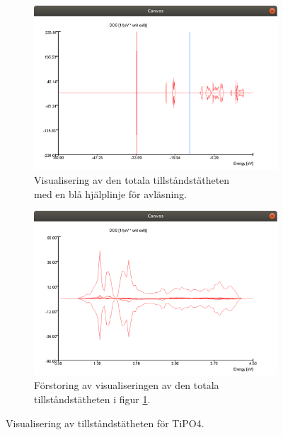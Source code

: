\begin{figure}[H]
    \begin{subfigure}{.5\textwidth}
        \centering
        \includegraphics[width=\linewidth]{images/TotalDoS.png}
        \caption{Visualisering av den totala tillståndstätheten \\med en blå hjälplinje för avläsning.}
        \label{fig:totDoS}
    \end{subfigure}%
    \begin{subfigure}{.5\textwidth}
        \centering
        \includegraphics[width=\linewidth]{images/ZoomedDoS.png}
        \caption{Förstoring av visualiseringen av den totala \\tillståndstätheten i figur \ref{fig:totDoS}.}
        \label{fig:zoomedDoS}
    \end{subfigure}
    \caption{Visualisering av tillståndstätheten för TiPO4.}
    \label{fig:DoS}
\end{figure}

